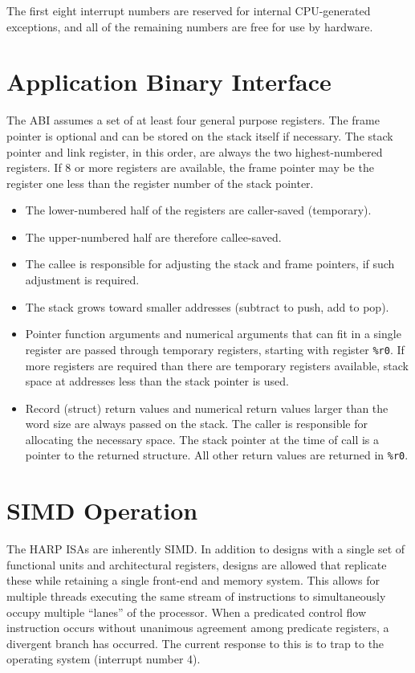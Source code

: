 \documentclass[10pt,letterpaper]{article}
\begin{document}
The first eight interrupt numbers are reserved for internal CPU-generated exceptions, and all of the remaining numbers are free for use by hardware.

\section{Application Binary Interface}
The ABI assumes a set of at least four general purpose registers.
The frame pointer is optional and can be stored on the stack itself if necessary.
The stack pointer and link register, in this order, are always the two highest-numbered registers.
If 8 or more registers are available, the frame pointer may be the register one less than the register number of the stack pointer.

\begin{itemize}
  \item The lower-numbered half of the registers are caller-saved (temporary).
  \item The upper-numbered half are therefore callee-saved.
  \item The callee is responsible for adjusting the stack and frame pointers, if such adjustment is required.
  \item The stack grows toward smaller addresses (subtract to push, add to pop).
  \item Pointer function arguments and numerical arguments that can fit in a single register are passed through temporary registers, starting with register \texttt{\%r0}. If more registers are required than there are temporary registers available, stack space at addresses less than the stack pointer is used.
  \item Record (struct) return values and numerical return values larger than the word size are always passed on the stack. The caller is responsible for allocating the necessary space. The stack pointer at the time of call is a pointer to the returned structure. All other return values are returned in \texttt{\%r0}.
\end{itemize}

\section{SIMD Operation}
The HARP ISAs are inherently SIMD.
In addition to designs with a single set of functional units and architectural registers, designs are allowed that replicate these while retaining a single front-end and memory system.
This allows for multiple threads executing the same stream of instructions to simultaneously occupy multiple ``lanes'' of the processor.
When a predicated control flow instruction occurs without unanimous agreement among predicate registers, a divergent branch has occurred.
The current response to this is to trap to the operating system (interrupt number 4).
\end{document}
